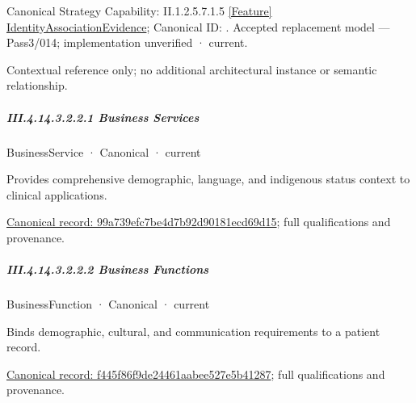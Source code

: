 {\small Canonical Strategy Capability: II.1.2.5.7.1.5 \hyperref[element:4389056525db482a8463e1f79bda5266]{[Feature] IdentityAssociationEvidence}; Canonical ID: \texttt{}. Accepted replacement model — Pass3/014; implementation unverified · current.}\par
Contextual reference only; no additional architectural instance or semantic relationship.\par
\subparagraph*{III.4.14.3.2.2.1 Business Services}
\label{navigation:III.4.14.3.2.2.1}

\label{navigation:III.4.14.3.2.2.1.1}

\label{element:99a739efc7be4d7b92d90181ecd69d15}
{\small BusinessService · Canonical · current}\par

Provides comprehensive demographic, language, and indigenous status context to clinical applications.


{\footnotesize \href{../../../../../../../continuum/business/business-service/99a739efc7be4d7b92d90181ecd69d15.md}{Canonical record: 99a739efc7be4d7b92d90181ecd69d15}; full qualifications and provenance.}\par
\subparagraph*{III.4.14.3.2.2.2 Business Functions}
\label{navigation:III.4.14.3.2.2.2}

\label{navigation:III.4.14.3.2.2.2.1}

\label{element:f445f86f9de24461aabee527e5b41287}
{\small BusinessFunction · Canonical · current}\par

Binds demographic, cultural, and communication requirements to a patient record.


{\footnotesize \href{../../../../../../../continuum/business/business-function/f445f86f9de24461aabee527e5b41287.md}{Canonical record: f445f86f9de24461aabee527e5b41287}; full qualifications and provenance.}\par
